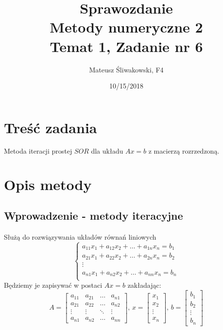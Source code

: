 \documentclass{article}
\title{Sprawozdanie \\Metody numeryczne 2 \\\textbf{Temat 1, Zadanie nr 6}}
\date{10/15/2018}
\author{Mateusz Śliwakowski, F4}
\begin{document}
  \maketitle
	  \newpage

\section{Treść zadania}
\paragraph{}
 Metoda iteracji prostej $SOR$ dla układu \(Ax = b\) z macierzą rozrzedzoną.
\section{Opis metody}

\subsection {Wprowadzenie - metody iteracyjne}
\paragraph{}
Służą do rozwiązywania układów równań liniowych
\[
\left\{ 
\begin{array}{c}
a_{11}x_1+a_{12}x_2+\dots+a_{1n}x_n=b_1 \\ 
a_{21}x_1+a_{22}x_2+\dots+a_{2n}x_n=b_2 \\ 
\vdots\\
a_{n1}x_1+a_{n2}x_2+\dots+a_{nn}x_n=b_n \\ 
\end{array}
\right.
\]
Będziemy je zapisywać w postaci \(Ax = b\) zakładając: \\
\[A=\begin{bmatrix}
  a_{11} & a_{21} & \dots & a_{n1}\\
  a_{21} & a_{22} & \dots & a_{n2}\\
 \vdots & \vdots & \ddots & \vdots \\
  a_{n1} & a_{n2} & \dots & a_{nn}
\end{bmatrix},\hspace{2pt}
 x=\begin{bmatrix}
 x_1\\
 x_2\\
 \vdots\\
 x_n
\end{bmatrix}, \hspace{2pt}
 b=\begin{bmatrix}
 b_1\\
 b_2\\
 \vdots\\
 b_n
\end{bmatrix}\]
\end{document}
